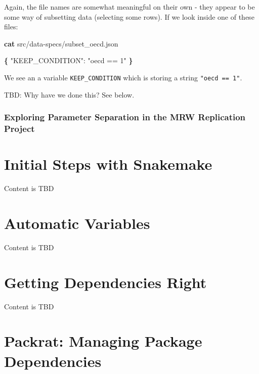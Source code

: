 \documentclass[]{book}
\newenvironment{Shaded}{\begin{snugshade}}{\end{snugshade}}
\newcommand{\KeywordTok}[1]{\textcolor[rgb]{0.13,0.29,0.53}{\textbf{{#1}}}}
\newcommand{\StringTok}[1]{\textcolor[rgb]{0.31,0.60,0.02}{{#1}}}
\newcommand{\NormalTok}[1]{{#1}}
\theoremstyle{definition}
\theoremstyle{definition}
\theoremstyle{definition}
\theoremstyle{remark}
\begin{document}
Again, the file names are somewhat meaningful on their own - they appear
to be some way of subsetting data (selecting some rows). If we look
inside one of these files:

\begin{Shaded}
\begin{Highlighting}[]
\KeywordTok{cat} \NormalTok{src/data-specs/subset_oecd.json}
\end{Highlighting}
\end{Shaded}

\begin{Shaded}
\begin{Highlighting}[]
\KeywordTok{\{}
    \StringTok{"KEEP_CONDITION"}\NormalTok{: }\StringTok{"oecd == 1"}
\KeywordTok{\}}
\end{Highlighting}
\end{Shaded}

We see an a variable \texttt{KEEP\_CONDITION} which is storing a string
\texttt{"oecd\ ==\ 1"}.

TBD: Why have we done this? See below.

\subsection{Exploring Parameter Separation in the MRW Replication
Project}\label{exploring-parameter-separation-in-the-mrw-replication-project}

\chapter{Initial Steps with
Snakemake}\label{initial-steps-with-snakemake}

Content is TBD

\chapter{Automatic Variables}\label{automatic-variables}

Content is TBD

\chapter{Getting Dependencies Right}\label{getting-dependencies-right}

Content is TBD

\chapter{Packrat: Managing Package
Dependencies}\label{packrat-managing-package-dependencies}
\end{document}
